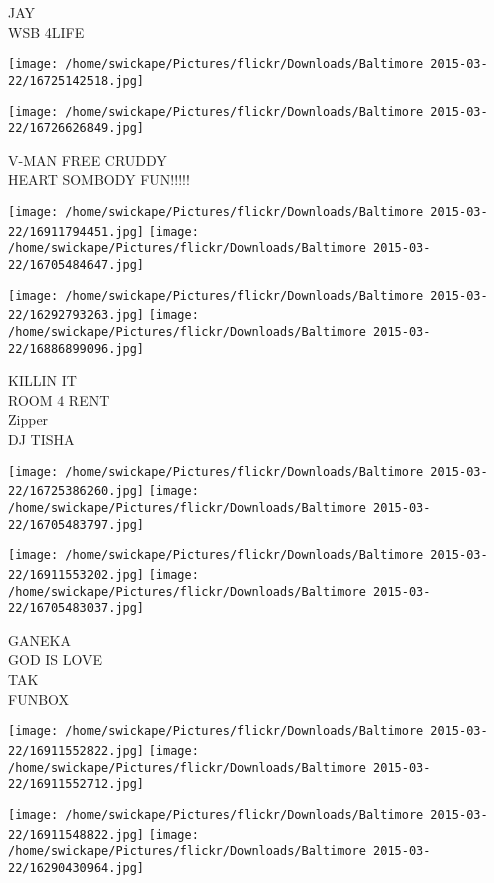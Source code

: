 \documentclass[10pt,letterpaper]{article}
\begin{document}
JAY\\
WSB 4LIFE\\
\pagebreak

\texttt{[image: /home/swickape/Pictures/flickr/Downloads/Baltimore 2015-03-22/16725142518.jpg]}

\vspace{0.25in}
\texttt{[image: /home/swickape/Pictures/flickr/Downloads/Baltimore 2015-03-22/16726626849.jpg]}

V{-}MAN FREE CRUDDY\\
HEART SOMBODY FUN!!!!!\\
\pagebreak

\texttt{[image: /home/swickape/Pictures/flickr/Downloads/Baltimore 2015-03-22/16911794451.jpg]}
\texttt{[image: /home/swickape/Pictures/flickr/Downloads/Baltimore 2015-03-22/16705484647.jpg]}

\texttt{[image: /home/swickape/Pictures/flickr/Downloads/Baltimore 2015-03-22/16292793263.jpg]}
\texttt{[image: /home/swickape/Pictures/flickr/Downloads/Baltimore 2015-03-22/16886899096.jpg]}

KILLIN IT\\
ROOM 4 RENT\\
Zipper\\
DJ TISHA\\
\pagebreak

\texttt{[image: /home/swickape/Pictures/flickr/Downloads/Baltimore 2015-03-22/16725386260.jpg]}
\texttt{[image: /home/swickape/Pictures/flickr/Downloads/Baltimore 2015-03-22/16705483797.jpg]}

\texttt{[image: /home/swickape/Pictures/flickr/Downloads/Baltimore 2015-03-22/16911553202.jpg]}
\texttt{[image: /home/swickape/Pictures/flickr/Downloads/Baltimore 2015-03-22/16705483037.jpg]}

GANEKA\\
GOD IS LOVE\\
TAK\\
FUNBOX\\
\pagebreak

\texttt{[image: /home/swickape/Pictures/flickr/Downloads/Baltimore 2015-03-22/16911552822.jpg]}
\texttt{[image: /home/swickape/Pictures/flickr/Downloads/Baltimore 2015-03-22/16911552712.jpg]}

\texttt{[image: /home/swickape/Pictures/flickr/Downloads/Baltimore 2015-03-22/16911548822.jpg]}
\texttt{[image: /home/swickape/Pictures/flickr/Downloads/Baltimore 2015-03-22/16290430964.jpg]}
\end{document}
